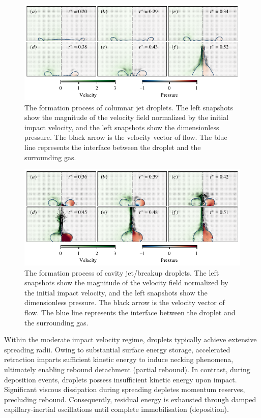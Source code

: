 \documentclass[lineno]{cls/jfm}
\begin{document}
 \begin{figure}
  \centerline{\includegraphics[width=1.0\textwidth]{fig/cojet.pdf}}
  \caption{The formation process of columnar jet droplets. The left snapshots show the magnitude of the velocity field normalized by the initial impact velocity, and the left snapshots show the dimensionless pressure. The black arrow is the velocity vector of flow. The blue line represents the interface between the droplet and the surrounding gas.}
 \label{fig:cojet}
 \end{figure}

 \begin{figure}
  \centerline{\includegraphics[width=1.0\textwidth]{fig/cajet.pdf}}
  \caption{The formation process of cavity jet/breakup droplets. The left snapshots show the magnitude of the velocity field normalized by the initial impact velocity, and the left snapshots show the dimensionless pressure. The black arrow is the velocity vector of flow. The blue line represents the interface between the droplet and the surrounding gas.}
 \label{fig:cajet}
 \end{figure}

 Within the moderate impact velocity regime, droplets typically achieve extensive spreading radii. Owing to substantial surface energy storage, accelerated retraction imparts sufficient kinetic energy to induce necking phenomena, ultimately enabling rebound detachment (partial rebound). In contrast, during deposition events, droplets possess insufficient kinetic energy upon impact. Significant viscous dissipation during spreading depletes momentum reserves, precluding rebound. Consequently, residual energy is exhausted through damped capillary-inertial oscillations until complete immobilisation (deposition). 
\end{document}
